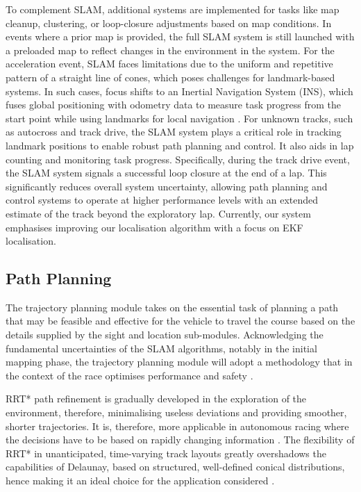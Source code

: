 \documentclass[a4paper,11pt]{report}
\begin{document}
To complement SLAM, additional systems are implemented for tasks like map cleanup, clustering, 
or loop-closure adjustments based on map conditions. In events where a prior map is provided, the 
full SLAM system is still launched with a preloaded map to reflect changes in the environment in the system. 
For the acceleration event, SLAM faces limitations due to the uniform and repetitive pattern of a straight line 
of cones, which poses challenges for landmark-based systems. In such cases, focus shifts to an Inertial Navigation 
System (INS), which fuses global positioning with odometry data to measure task progress from the start point while 
using landmarks for local navigation \cite{reference25}. For unknown tracks, such as autocross and track drive, the SLAM system plays 
a critical role in tracking landmark positions to enable robust path planning and control. It also aids in lap 
counting and monitoring task progress. Specifically, during the track drive event, the SLAM system signals a successful 
loop closure at the end of a lap. This significantly reduces overall system uncertainty, allowing path planning and control 
systems to operate at higher performance levels with an extended estimate of the track beyond the exploratory lap. Currently, 
our system emphasises improving our localisation algorithm with a focus on EKF localisation.

\subsection{Path Planning}

The trajectory planning module takes on the essential task of planning a path that may be feasible and effective for 
the vehicle to travel the course based on the details supplied by the sight and location sub-modules. 
Acknowledging the fundamental uncertainties of the SLAM algorithms, notably in the initial mapping phase, the trajectory 
planning module will adopt a methodology that in the context of the race optimises performance and safety \cite{reference6}.

RRT* path refinement is gradually developed in the exploration of the environment, therefore, minimalising 
useless deviations and providing smoother, shorter trajectories. It is, therefore, more applicable in autonomous racing 
where the decisions have to be based on rapidly changing information \cite{reference3, reference4}. The flexibility of RRT* in unanticipated, time-varying 
track layouts greatly overshadows the capabilities of Delaunay, based on structured, well-defined conical distributions, 
hence making it an ideal choice for the application considered \cite{reference1}.
\end{document}
